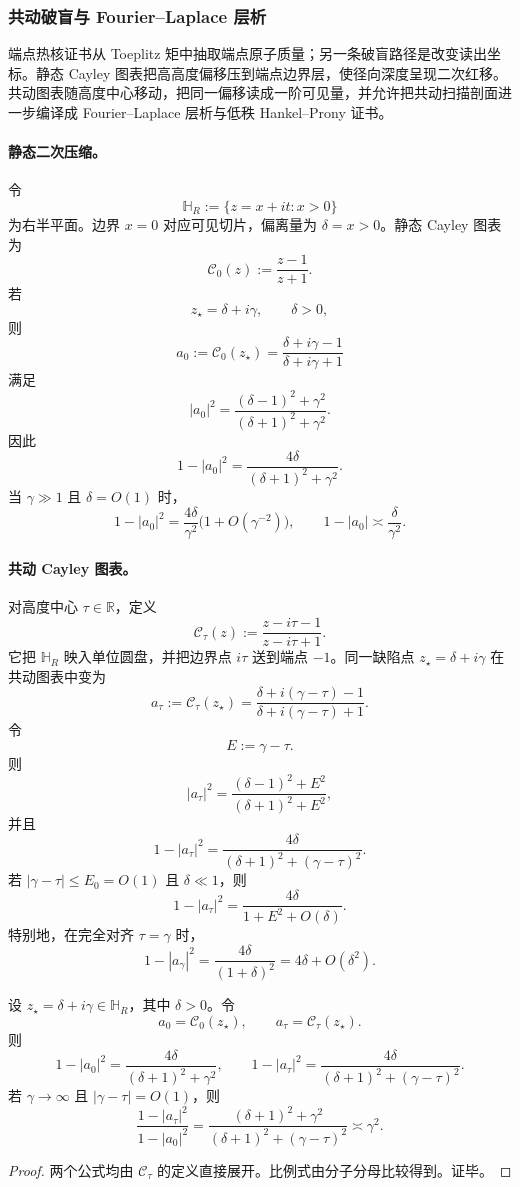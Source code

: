 \subsubsection{共动破盲与 Fourier--Laplace 层析}\label{subsubsec:typed-address-biaxial-completion-comoving-tomography-blindspot-resolution}
端点热核证书从 Toeplitz 矩中抽取端点原子质量；另一条破盲路径是改变读出坐标。静态 Cayley 图表把高高度偏移压到端点边界层，使径向深度呈现二次红移。共动图表随高度中心移动，把同一偏移读成一阶可见量，并允许把共动扫描剖面进一步编译成 Fourier--Laplace 层析与低秩 Hankel--Prony 证书。

\paragraph{静态二次压缩。}
令
\[
\mathbb H_R:=\{z=x+it:x>0\}
\]
为右半平面。边界 \(x=0\) 对应可见切片，偏离量为 \(\delta=x>0\)。静态 Cayley 图表为
\[
\mathcal C_0(z):=\frac{z-1}{z+1}.
\]
若
\[
z_\star=\delta+i\gamma,
\qquad
\delta>0,
\]
则
\[
a_0:=\mathcal C_0(z_\star)
=
\frac{\delta+i\gamma-1}{\delta+i\gamma+1}
\]
满足
\[
|a_0|^2
=
\frac{(\delta-1)^2+\gamma^2}{(\delta+1)^2+\gamma^2}.
\]
因此
\[
\boxed{
1-|a_0|^2
=
\frac{4\delta}{(\delta+1)^2+\gamma^2}.
}
\]
当 \(\gamma\gg1\) 且 \(\delta=O(1)\) 时，
\[
1-|a_0|^2
=
\frac{4\delta}{\gamma^2}
\bigl(1+O(\gamma^{-2})\bigr),
\qquad
1-|a_0|\asymp\frac{\delta}{\gamma^2}.
\]

\paragraph{共动 Cayley 图表。}
对高度中心 \(\tau\in\mathbb R\)，定义
\[
\boxed{
\mathcal C_\tau(z)
:=
\frac{z-i\tau-1}{z-i\tau+1}.
}
\]
它把 \(\mathbb H_R\) 映入单位圆盘，并把边界点 \(i\tau\) 送到端点 \(-1\)。同一缺陷点 \(z_\star=\delta+i\gamma\) 在共动图表中变为
\[
a_\tau:=\mathcal C_\tau(z_\star)
=
\frac{\delta+i(\gamma-\tau)-1}{\delta+i(\gamma-\tau)+1}.
\]
令
\[
E:=\gamma-\tau.
\]
则
\[
|a_\tau|^2
=
\frac{(\delta-1)^2+E^2}{(\delta+1)^2+E^2},
\]
并且
\[
\boxed{
1-|a_\tau|^2
=
\frac{4\delta}{(\delta+1)^2+(\gamma-\tau)^2}.
}
\]
若 \(|\gamma-\tau|\le E_0=O(1)\) 且 \(\delta\ll1\)，则
\[
1-|a_\tau|^2
=
\frac{4\delta}{1+E^2+O(\delta)}.
\]
特别地，在完全对齐 \(\tau=\gamma\) 时，
\[
1-|a_\gamma|^2
=
\frac{4\delta}{(1+\delta)^2}
=
4\delta+O(\delta^2).
\]

\begin{theorem}[共动图表的显影增益]\label{thm:typed-address-biaxial-completion-comoving-chart-redshift-gain}
设 \(z_\star=\delta+i\gamma\in\mathbb H_R\)，其中 \(\delta>0\)。令
\[
a_0=\mathcal C_0(z_\star),
\qquad
a_\tau=\mathcal C_\tau(z_\star).
\]
则
\[
1-|a_0|^2
=
\frac{4\delta}{(\delta+1)^2+\gamma^2},
\qquad
1-|a_\tau|^2
=
\frac{4\delta}{(\delta+1)^2+(\gamma-\tau)^2}.
\]
若 \(\gamma\to\infty\) 且 \(|\gamma-\tau|=O(1)\)，则
\[
\frac{1-|a_\tau|^2}{1-|a_0|^2}
=
\frac{(\delta+1)^2+\gamma^2}{(\delta+1)^2+(\gamma-\tau)^2}
\asymp
\gamma^2.
\]
\end{theorem}
\begin{proof}
两个公式均由 \(\mathcal C_\tau\) 的定义直接展开。比例式由分子分母比较得到。证毕。
\end{proof}

